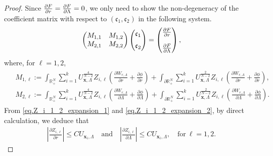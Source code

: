 \documentclass[11pt,a4paper]{amsart}
\begin{document}
\begin{proof}
Since $\frac{\partial F}{\partial r}= \frac{\partial F}{\partial \Lambda}=0 \vspace{5pt}$, we only need to show the non-degeneracy of the coefficient matrix with respect to $(\mathfrak c_1,\mathfrak c_2)$ in the following system.
  \begin{align*}
    \begin{pmatrix}
      M_{1,1} & M_{1,2}\\
      M_{2,1} & M_{2,2}
    \end{pmatrix}
    \begin{pmatrix}
    \mathfrak c_1 \vspace{5pt}\\ \mathfrak c_2
    \end{pmatrix} =
    \begin{pmatrix}
      \frac{\partial F}{\partial r} \vspace{10pt}\\
      \frac{\partial F}{\partial \Lambda}
    \end{pmatrix},
  \end{align*}
  where, for $\ell=1,2$,
  \begin{align*}
    \begin{aligned}
      &M_{1,\ell} := \int_{\mathbb{R}_{+}^{N}}\sum_{i=1}^{k} U_{\mathbf{x},\Lambda}^{\frac{4}{N-2}} Z_{i,\ell}\left(\frac{\partial W_{r,\Lambda}}{\partial r}+\frac{\partial \phi}{\partial r}\right)+\int_{\partial\mathbb{R}_{+}^{N}}\sum_{i=1}^{k} U_{\mathbf{x},\Lambda}^{\frac{2}{N-2}} Z_{i,\ell}\left(\frac{\partial W_{r,\Lambda}}{\partial r}+\frac{\partial \phi}{\partial r}\right),\\
      &M_{2,\ell} :=  \int_{\mathbb{R}_{+}^{N}}\sum_{i=1}^{k} U_{\mathbf{x},\Lambda}^{\frac{4}{N-2}} Z_{i,\ell}\left(\frac{\partial W_{r,\Lambda}}{\partial \Lambda}+\frac{\partial \phi}{\partial \Lambda}\right)+\int_{\partial\mathbb{R}_{+}^{N}}\sum_{i=1}^{k} U_{\mathbf{x},\Lambda}^{\frac{2}{N-2}} Z_{i,\ell}\left(\frac{\partial W_{r,\Lambda}}{\partial \Lambda}+\frac{\partial \phi}{\partial \Lambda}\right).
    \end{aligned}
  \end{align*}
  From \eqref{eq.Z_i_1_2_expansion_1} and \eqref{eq.Z_i_1_2_expansion_2}, by direct calculation,  we deduce that
  \begin{align*}
    \left|\frac{\partial Z_{i,\ell}}{\partial r}\right| \leq C U_{\mathbf{x}_{i},\Lambda} \quad\text{and}\quad \left|\frac{\partial Z_{i,\ell}}{\partial \Lambda}\right| \leq C U_{\mathbf{x}_{i},\Lambda}, \quad\text{for}~ \ell=1,2.

\end{align*}
\end{proof}
\end{document}

